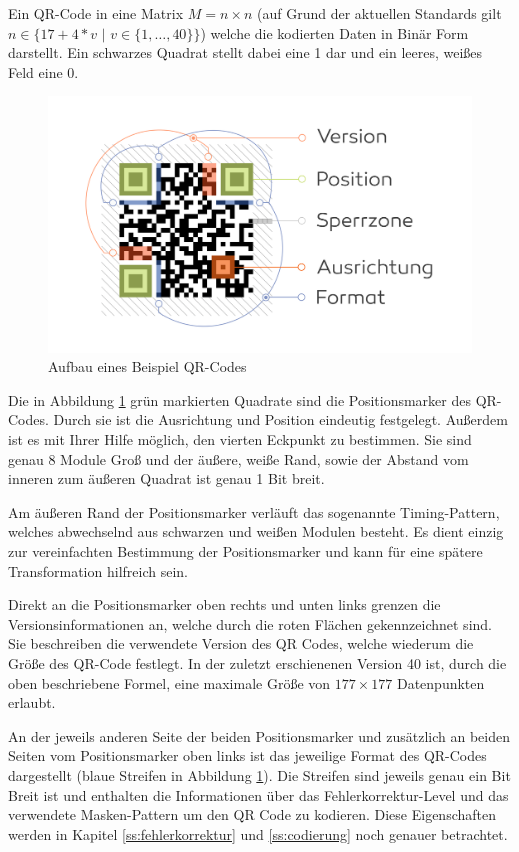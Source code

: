 \documentclass[a4paper, oneside, 12pt]{article}
\begin{document}
Ein QR-Code in eine Matrix $M = n \times n$ \Big(auf Grund der aktuellen Standards gilt $n \in \big\{17+4*v \,\, | \,\, v \in  \{1,\dots, 40\}\big\}$\Big) welche die kodierten Daten in Binär Form darstellt. Ein schwarzes Quadrat stellt dabei eine 1 dar und ein leeres, weißes Feld eine 0.

\begin{figure}[h]
	\includegraphics[width=\textwidth]{images/aufbau.png}
	\caption{Aufbau eines Beispiel QR-Codes}
	\label{fig:aufbau}
\end{figure}

Die in Abbildung \ref{fig:aufbau} grün markierten Quadrate sind die Positionsmarker des QR-Codes. Durch sie ist die Ausrichtung und Position eindeutig festgelegt. Außerdem ist es mit Ihrer Hilfe möglich, den vierten Eckpunkt zu bestimmen. Sie sind genau 8 Module Groß und der äußere, weiße Rand, sowie der Abstand vom inneren zum äußeren Quadrat ist genau 1 Bit breit.

Am äußeren Rand der Positionsmarker verläuft das sogenannte Timing-Pattern, welches abwechselnd aus schwarzen und weißen Modulen besteht. Es dient einzig zur vereinfachten Bestimmung der Positionsmarker und kann für eine spätere Transformation hilfreich sein.

Direkt an die Positionsmarker oben rechts und unten links grenzen die Versionsinformationen an,  welche durch die roten Flächen gekennzeichnet sind. Sie beschreiben die verwendete Version des QR Codes, welche wiederum die Größe des QR-Code festlegt. In der zuletzt erschienenen Version 40 ist, durch die oben beschriebene Formel, eine maximale Größe von $177 \times 177$ Datenpunkten erlaubt.

An der jeweils anderen Seite der beiden Positionsmarker und zusätzlich an beiden Seiten vom Positionsmarker oben links ist das jeweilige Format des QR-Codes dargestellt (blaue Streifen in Abbildung \ref{fig:aufbau}). Die Streifen sind jeweils genau ein Bit Breit ist und enthalten die Informationen über das Fehlerkorrektur-Level und das verwendete Masken-Pattern um den QR Code zu kodieren. Diese Eigenschaften werden in Kapitel \ref{ss:fehlerkorrektur} und \ref{ss:codierung} noch genauer  betrachtet.
\end{document}
